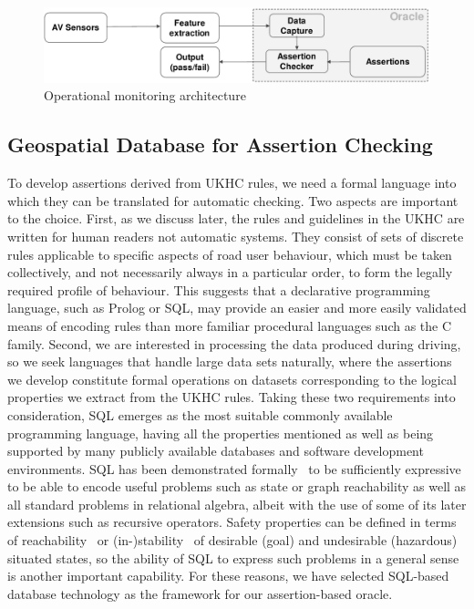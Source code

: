   
 
\begin{figure}[h!]
    \centering
    \includegraphics[width=0.98\linewidth]{../other/figures/RuntimeAssertionsTestBenchArchitectureV6.pdf}
    \caption{Operational monitoring architecture}
    \label{fig:RuntimeArchitecture}
\end{figure}


\subsection{Geospatial Database for Assertion Checking} \label{geospatial_database}
To develop assertions derived from UKHC rules, we need a formal language into which they can be translated for automatic checking. Two aspects are important to the choice. First, as we discuss later, the rules and guidelines in the UKHC are written for human readers not automatic systems. They consist of sets of discrete rules applicable to specific aspects of road user behaviour, which must be taken collectively, and not necessarily always in a particular order, to form the legally required profile of behaviour. This suggests that a declarative programming language, such as Prolog or SQL, may provide an easier and more easily validated means of encoding rules than more familiar procedural languages such as the C family. 
%
Second, we are interested in processing the data produced during driving, so we seek languages that handle large data sets naturally, where the assertions we develop constitute formal operations on datasets corresponding to the logical properties we extract from the UKHC rules. Taking these two requirements into consideration, SQL emerges as the most suitable commonly available programming language, having all the properties mentioned as well as being supported by many publicly available databases and software development environments. SQL has been demonstrated formally~\cite{sqllibkin} to be sufficiently expressive to be able to encode useful problems such as state or graph reachability as well as all standard problems in relational algebra, albeit with the use of some of its later extensions such as recursive operators. Safety properties can be defined in terms of reachability~\cite{guiochet2015, masson2019} or (in-)stability~\cite{harper2005, xue2020} of desirable (goal) and undesirable (hazardous) situated states, so the ability of SQL to express such problems in a general sense is another important capability. For these reasons, we have selected SQL-based database technology as the framework for our assertion-based oracle. 

